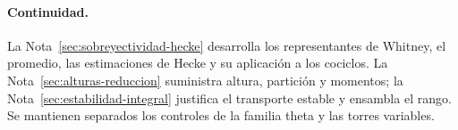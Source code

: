 \paragraph{Continuidad.} La Nota~\ref{sec:sobreyectividad-hecke} desarrolla los representantes de Whitney, el promedio, las estimaciones de Hecke y su aplicación a los cociclos. La Nota~\ref{sec:alturas-reduccion} suministra altura, partición y momentos; la Nota~\ref{sec:estabilidad-integral} justifica el transporte estable y ensambla el rango. Se mantienen separados los controles de la familia theta y las torres variables.